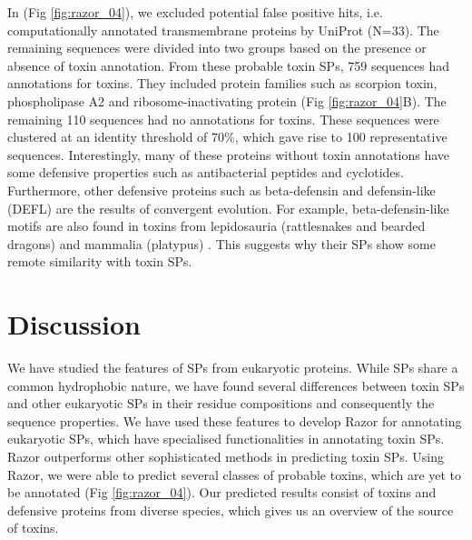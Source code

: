 


In (Fig \ref{fig:razor_04}), we excluded potential false positive hits, i.e. computationally annotated transmembrane proteins by UniProt (N=33). The remaining sequences were divided into two groups based on the presence or absence of toxin annotation. From these probable toxin SPs, 759 sequences had annotations for toxins. They included protein families such as scorpion toxin, phospholipase A2 and ribosome-inactivating protein (Fig \ref{fig:razor_04}B). The remaining 110 sequences had no annotations for toxins. These sequences were clustered at an identity threshold of 70\%, which gave rise to 100 representative sequences. Interestingly, many of these proteins without toxin annotations have some defensive properties such as antibacterial peptides and cyclotides. Furthermore, other defensive proteins such as beta-defensin and defensin-like (DEFL) are the results of convergent evolution. For example, beta-defensin-like motifs are also found in toxins from lepidosauria (rattlesnakes and bearded dragons) and mammalia (platypus) \cite{Fry2009-iu,Fry2010-bs,Whittington2008-vm}. This suggests why their SPs show some remote similarity with toxin SPs.


\section{Discussion}
We have studied the features of SPs from eukaryotic proteins. While SPs share a common hydrophobic nature, we have found several differences between toxin SPs and other eukaryotic SPs in their residue compositions and consequently the sequence properties. We have used these features to develop Razor for annotating eukaryotic SPs, which have specialised functionalities in annotating toxin SPs. Razor outperforms other sophisticated methods in predicting toxin SPs. Using Razor, we were able to predict several classes of probable toxins, which are yet to be annotated (Fig \ref{fig:razor_04}). Our predicted results consist of toxins and defensive proteins from diverse species, which gives us an overview of the source of toxins.

